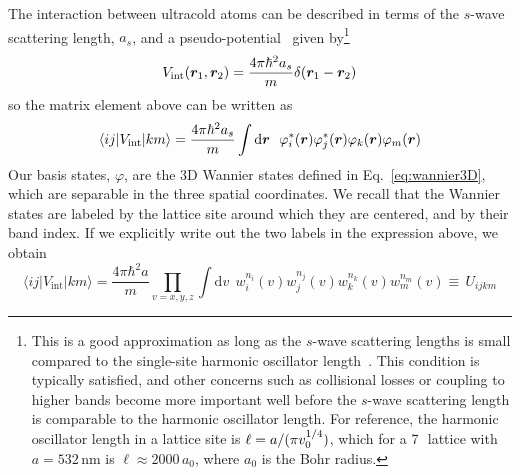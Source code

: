 The interaction between ultracold atoms can be described in terms of the
$s$-wave scattering length, $a_{s}$,  and a
pseudo-potential~\cite{sakurai2014modern,Bloch2008} given by\footnote{This is a
good approximation as long as the $s$-wave scattering lengths is small compared
to the single-site harmonic oscillator length~\cite{Busch1998}. This condition
is typically satisfied, and other concerns such as collisional losses or
coupling to higher bands become more important well before the $s$-wave
scattering length is comparable to the harmonic oscillator length.  For
reference, the harmonic oscillator length in a lattice site is $\ell = a / (\pi
v_{0}^{1/4})$, which for a 7\,\er\ lattice with $a=532\,$nm is $\ell \approx
2000\,a_{0}$, where $a_{0}$ is the Bohr radius.}
\begin{equation}
    V_{\mathrm{int}}(\bm{r}_{1},\bm{r}_{2}) 
    = \frac{ 4 \pi \hbar^{2} a_{s} } { m } \delta(\bm{r}_{1}-\bm{r}_{2}) 
\end{equation}
so the matrix element above can be written as 
\begin{equation}
    \langle ij | V_{\mathrm{int}} | km \rangle =
\frac{ 4 \pi \hbar^{2} a_{s} } { m }
    \int \mathrm{d}\bm{r}  \ \  \varphi_{i}^{*}(\bm{r}) \varphi_{j}^{*}(\bm{r}) 
                                \varphi_{k}(\bm{r}) \varphi_{m}(\bm{r}) 
\end{equation}
Our basis states, $\varphi$, are the 3D Wannier states defined in
Eq.~\ref{eq:wannier3D}, which are separable in the three spatial coordinates.
We recall that the Wannier states are labeled by the lattice site around which
they are centered, and by their band index.   If we explicitly write out the two
labels in the expression above, we obtain
\begin{equation}
    \langle ij | V_{\mathrm{int}} | km \rangle =
\frac{ 4 \pi \hbar^{2} a } { m }
  \prod_{v=x,y,z}
    \int \mathrm{d}v  \ \ 
    w_{i}^{n_{i}}(v) w_{j}^{n_{j}}(v) w_{k}^{n_{k}}(v) w_{m}^{n_{m}}(v) 
   \equiv \, U_{ijkm}
\end{equation}

